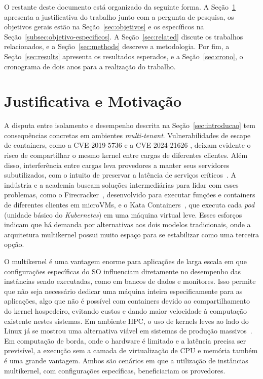 \documentclass[12pt]{article}
\begin{document}
O restante deste documento está organizado da seguinte forma. A Seção~\ref{sec:just} apresenta a justificativa do
trabalho junto com a pergunta de pesquisa, os objetivos gerais estão na Seção~\ref{sec:objetivos} e os específicos na Seção~\ref{subsec:objetivo-especificos}.
A Seção~\ref{sec:related} discute os trabalhos relacionados, e a Seção~\ref{sec:methods} descreve a metodologia.
Por fim, a Seção~\ref{sec:results} apresenta os resultados esperados, e a Seção~\ref{sec:crono}, o cronograma
de dois anos para a realização do trabalho.

\section{Justificativa e Motivação} \label{sec:just}

A disputa entre isolamento e desempenho descrita na Seção~\ref{sec:introducao} tem consequências concretas em ambientes
\textit{multi-tenant}.
Vulnerabilidades de escape de containers, como a CVE-2019-5736 e a CVE-2024-21626 \cite{cve20195736,cve202421626},
deixam evidente o risco de compartilhar o mesmo kernel entre cargas de diferentes clientes.
Além disso, interferência entre cargas leva provedores a manter seus servidores subutilizados, com o intuito de
preservar a latência de serviços críticos~\cite{lo2015heracles}.
A indústria e a academia buscam soluções intermediárias
para lidar com esses problemas, como o Firecracker~\cite{agache2020firecracker}, desenvolvido para executar funções e
containers de diferentes clientes em microVMs, e o Kata Containers~\cite{katacontainers}, que executa cada \textit{pod} (unidade básico do \textit{Kubernetes})
em uma máquina virtual leve.
Esses esforços indicam que há demanda por alternativas aos dois modelos tradicionais, onde a arquitetura multikernel possui muito
espaço para se estabilizar como uma terceira opção.

O multikernel é uma vantagem enorme para aplicações de larga escala em que configurações específicas do SO
influenciam diretamente no desempenho das instâncias sendo executadas, como em bancos de dados e monitores.
Isso permite que não seja necessário dedicar uma máquina inteira especificamente para as aplicações, algo que não é possível
com containers devido ao compartilhamento do kernel hospedeiro, evitando custos e dando maior velocidade à
computação existente nestes sistemas.
Em ambiente HPC, o uso de kernels leves ao lado do Linux já se mostrou uma alternativa viável em sistemas de produção massivos~\cite{gerofi2016mckernel}.
Em computação de borda, onde o hardware é limitado e a latência precisa ser previsível, a execução sem a camada de virtualização de CPU e memória também
é uma grande vantagem.
Ambos são cenários em que a utilização de instâncias multikernel, com configurações específicas, beneficiariam os provedores.
\end{document}
